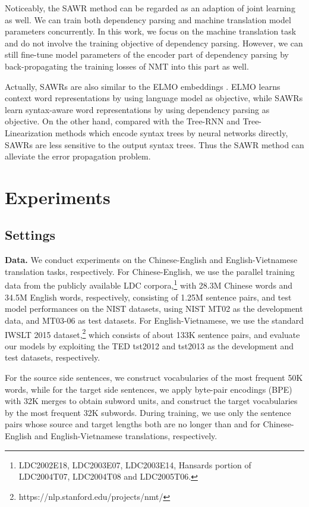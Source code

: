 \documentclass[11pt,a4paper]{article}
\begin{document}
\begin{CJK}{UTF8}{gbsn}
Noticeably, the SAWR method can be regarded as an adaption of joint learning as well.
We can train both dependency parsing and machine translation model parameters concurrently.
In this work, we focus on the machine translation task
and do not involve the training objective of dependency parsing.
However, we can still fine-tune model parameters of the encoder part of dependency parsing
by back-propagating the training losses of NMT into this part as well.


Actually, SAWRs are also similar to the ELMO embeddings \cite{N18-1202-elmo}.
ELMO learns context word representations by using language model as objective,
while SAWRs learn syntax-aware word representations by using dependency parsing as objective.
On the other hand,
compared with the Tree-RNN and Tree-Linearization methods which encode syntax trees by neural networks directly,
SAWRs are less sensitive to the output syntax trees.
Thus the SAWR method can alleviate the error propagation problem.




\section{Experiments}


\subsection{Settings}

\textbf{Data.} We conduct experiments on the Chinese-English and English-Vietnamese translation tasks, respectively.
For Chinese-English,
we use the parallel training data from the publicly available LDC
corpora,\footnote{LDC2002E18, LDC2003E07, LDC2003E14, Hansards portion of LDC2004T07, LDC2004T08 and LDC2005T06.}
with 28.3M Chinese words and 34.5M English words, respectively,
consisting of 1.25M sentence pairs,
and test model performances on the NIST datasets,
using NIST MT02 as the development data, and MT03-06 as test datasets.
For English-Vietnamese, we use the standard  IWSLT 2015 dataset,\footnote{https://nlp.stanford.edu/projects/nmt/}
which consists of about 133K sentence pairs,
and evaluate our models by exploiting the TED tst2012  and tst2013
as the development and test datasets, respectively.

For the source side sentences,
we construct vocabularies of the most frequent 50K words,
while for the target side sentences,
we apply byte-pair encodings (BPE) \cite{sennrich-haddow-birch:2016:P16-12}
with 32K merges to obtain subword units,
and construct the target vocabularies by the most frequent 32K subwords.
During training,
we use only the sentence pairs whose source and target lengths both are no longer than  and  for Chinese-English and English-Vietnamese translations, respectively.




\end{CJK}
\end{document}
